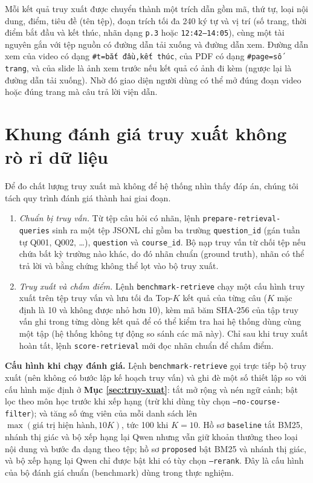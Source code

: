 \bigbreak\noindent
Mỗi kết quả truy xuất được chuyển thành một trích dẫn gồm mã, thứ tự, loại nội dung, điểm, tiêu đề (tên tệp), đoạn trích tối đa 240 ký tự và vị trí (số trang, thời điểm bắt đầu và kết thúc, nhãn dạng \texttt{p.3} hoặc \texttt{12:42--14:05}), cùng một tài nguyên gắn với tệp nguồn có đường dẫn tải xuống và đường dẫn xem. Đường dẫn xem của video có dạng \texttt{\#t=bắt đầu,kết thúc}, của PDF có dạng \texttt{\#page=số trang}, và của slide là ảnh xem trước nếu kết quả có ảnh đi kèm (ngược lại là đường dẫn tải xuống). Nhờ đó giao diện người dùng có thể mở đúng đoạn video hoặc đúng trang mà câu trả lời viện dẫn.


\section{Khung đánh giá truy xuất không rò rỉ dữ liệu}\label{sec:khung-danh-gia}

Để đo chất lượng truy xuất mà không để hệ thống nhìn thấy đáp án, chúng tôi tách quy trình đánh giá thành hai giai đoạn.

\begin{enumerate}
    \item \emph{Chuẩn bị truy vấn.} Từ tệp câu hỏi có nhãn, lệnh \texttt{prepare-\allowbreak retrieval-\allowbreak queries} sinh ra một tệp JSONL chỉ gồm ba trường \texttt{question\_id} (gán tuần tự Q001, Q002, \ldots), \texttt{question} và \texttt{course\_id}. Bộ nạp truy vấn từ chối tệp nếu chứa bất kỳ trường nào khác, do đó nhãn chuẩn (ground truth), nhãn có thể trả lời và bằng chứng không thể lọt vào bộ truy xuất.
    \item \emph{Truy xuất và chấm điểm.} Lệnh \texttt{benchmark-retrieve} chạy một cấu hình truy xuất trên tệp truy vấn và lưu tối đa Top-$K$ kết quả của từng câu ($K$ mặc định là 10 và không được nhỏ hơn 10), kèm mã băm SHA-256 của tập truy vấn ghi trong từng dòng kết quả để có thể kiểm tra hai hệ thống dùng cùng một tập (hệ thống không tự động so sánh các mã này). Chỉ sau khi truy xuất hoàn tất, lệnh \texttt{score-retrieval} mới đọc nhãn chuẩn để chấm điểm.
\end{enumerate}

\bigbreak\noindent
\textbf{Cấu hình khi chạy đánh giá.} Lệnh \texttt{benchmark-retrieve} gọi trực tiếp bộ truy xuất (nên không có bước lập kế hoạch truy vấn) và ghi đè một số thiết lập so với cấu hình mặc định ở \textbf{Mục \ref{sec:truy-xuat}}: tắt mở rộng và nén ngữ cảnh; bật lọc theo môn học trước khi xếp hạng (trừ khi dùng tùy chọn \texttt{--no-course-filter}); và tăng số ứng viên của mỗi danh sách lên $\max(\text{giá trị hiện hành}, 10K)$, tức 100 khi $K = 10$. Hồ sơ \texttt{baseline} tắt BM25, nhánh thị giác và bộ xếp hạng lại Qwen nhưng vẫn giữ khoản thưởng theo loại nội dung và bước đa dạng theo tệp; hồ sơ \texttt{proposed} bật BM25 và nhánh thị giác, và bộ xếp hạng lại Qwen chỉ được bật khi có tùy chọn \texttt{--rerank}. Đây là cấu hình của bộ đánh giá chuẩn (benchmark) dùng trong thực nghiệm.

